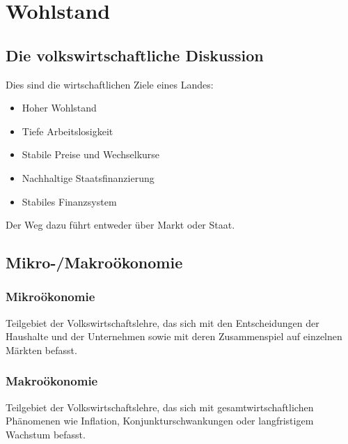 \section{Wohlstand}
\subsection{Die volkswirtschaftliche Diskussion}
Dies sind die wirtschaftlichen Ziele eines Landes:
\begin{itemize}
	\item Hoher Wohlstand
	\item Tiefe Arbeitslosigkeit
	\item Stabile Preise und Wechselkurse
	\item Nachhaltige Staatsfinanzierung
	\item Stabiles Finanzsystem
\end{itemize}
Der Weg dazu führt entweder über Markt oder Staat.

\subsection{Mikro-/Makroökonomie}
\begin{multicols}{2}
\subsubsection{Mikroökonomie}
Teilgebiet der Volkswirtschaftslehre, das sich mit den Entscheidungen der Haushalte und der Unternehmen sowie mit deren Zusammenspiel auf einzelnen Märkten befasst.
\columnbreak
\subsubsection{Makroökonomie}
Teilgebiet der Volkswirtschaftslehre, das sich mit gesamtwirtschaftlichen Phänomenen wie Inflation, Konjunkturschwankungen oder langfristigem Wachstum befasst.
\end{multicols}

